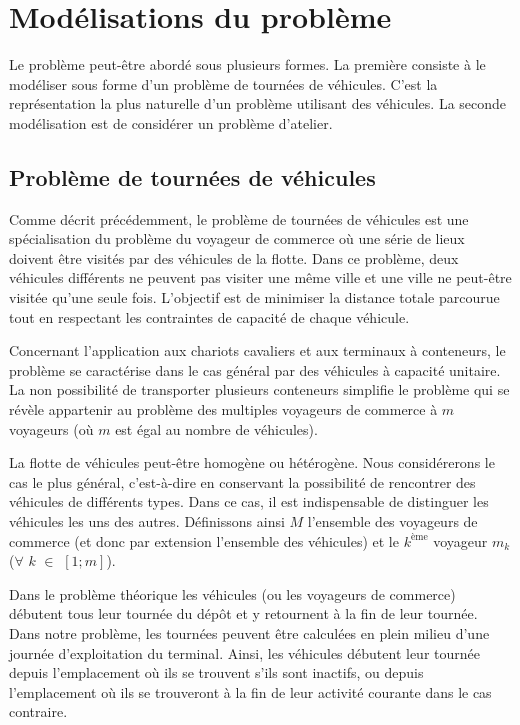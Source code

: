 \section{Modélisations du problème}

Le problème peut-être abordé sous plusieurs formes. La première consiste à le modéliser sous forme d'un problème de tournées de véhicules. C'est la représentation la plus naturelle d'un problème utilisant des véhicules. La seconde modélisation est de considérer un problème d'atelier.

\subsection{Problème de tournées de véhicules}\label{chapitre:ordo:sec:modelisation:subsec:vrp}

Comme décrit précédemment, le problème de tournées de véhicules est une spécialisation du problème du voyageur de commerce où une série de lieux doivent être visités par des véhicules de la flotte. Dans ce problème, deux véhicules différents ne peuvent pas visiter une même ville et une ville ne peut-être visitée qu'une seule fois. L'objectif est de minimiser la distance totale parcourue tout en respectant les contraintes de capacité de chaque véhicule.


Concernant l'application aux chariots cavaliers et aux terminaux à conteneurs, le problème se caractérise dans le cas général par des véhicules à capacité unitaire. La non possibilité de transporter plusieurs conteneurs simplifie le problème qui se révèle appartenir au problème des multiples voyageurs de commerce à $m$ voyageurs (où $m$ est égal au nombre de véhicules). 


La flotte de véhicules peut-être homogène ou hétérogène. Nous considérerons le cas le plus général, c'est-à-dire en conservant la possibilité de rencontrer des véhicules de différents types. Dans ce cas, il est indispensable de distinguer les véhicules les uns des autres. Définissons ainsi $M$ l'ensemble des voyageurs de commerce (et donc par extension l'ensemble des véhicules) et le $k^{\text{ème}}$ voyageur $m_k$ ($\forall$ $k$ $\in$ $[1;m]$).

Dans le problème théorique les véhicules (ou les voyageurs de commerce) débutent tous leur tournée du dépôt et y retournent à la fin de leur tournée. Dans notre problème, les tournées peuvent être calculées en plein milieu d'une journée d'exploitation du terminal. Ainsi, les véhicules débutent leur tournée depuis l'emplacement où ils se trouvent s'ils sont inactifs, ou depuis l'emplacement où ils se trouveront à la fin de leur activité courante dans le cas contraire.

